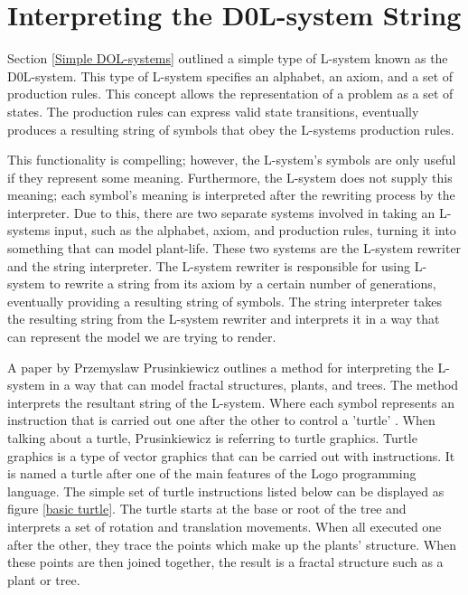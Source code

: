\section{Interpreting the D0L-system String} \label{Interpreting DOL-system}

Section \ref{Simple DOL-systems} outlined a simple type of L-system known as the D0L-system. This type of L-system specifies an alphabet, an axiom, and a set of production rules. This concept allows the representation of a problem as a set of states. The production rules can express valid state transitions, eventually produces a resulting string of symbols that obey the L-systems production rules. 

This functionality is compelling; however, the L-system's symbols are only useful if they represent some meaning. Furthermore, the L-system does not supply this meaning; each symbol's meaning is interpreted after the rewriting process by the interpreter. Due to this, there are two separate systems involved in taking an L-systems input, such as the alphabet, axiom, and production rules, turning it into something that can model plant-life. These two systems are the L-system rewriter and the string interpreter. The L-system rewriter is responsible for using L-system to rewrite a string from its axiom by a certain number of generations, eventually providing a resulting string of symbols. The string interpreter takes the resulting string from the L-system rewriter and interprets it in a way that can represent the model we are trying to render. 

A paper by Przemyslaw Prusinkiewicz outlines a method for interpreting the L-system in a way that can model fractal structures, plants, and trees. The method interprets the resultant string of the L-system. Where each symbol represents an instruction that is carried out one after the other to control a 'turtle' \cite{prusinkiewicz1986graphical}. When talking about a turtle, Prusinkiewicz is referring to turtle graphics. Turtle graphics is a type of vector graphics that can be carried out with instructions. It is named a turtle after one of the main features of the Logo programming language. The simple set of turtle instructions listed below can be displayed as figure \ref{basic turtle}. The turtle starts at the base or root of the tree and interprets a set of rotation and translation movements. When all executed one after the other, they trace the points which make up the plants' structure. When these points are then joined together, the result is a fractal structure such as a plant or tree.

